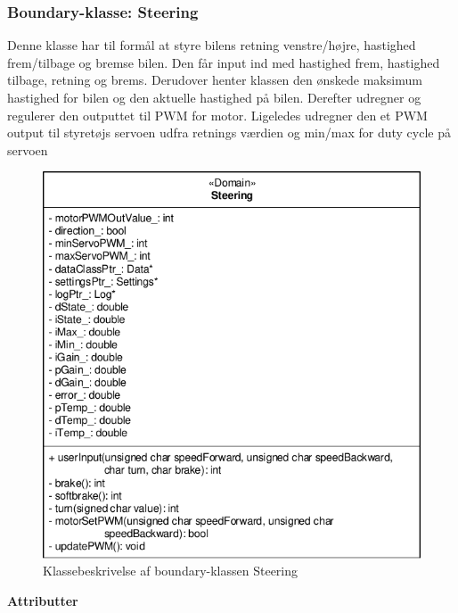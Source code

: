 
\subsubsection{Boundary-klasse: Steering}
Denne klasse har til formål at styre bilens retning venstre/højre, hastighed frem/tilbage og bremse bilen. Den får input ind med hastighed frem, hastighed tilbage, retning og brems. Derudover henter klassen den ønskede maksimum hastighed for bilen og den aktuelle hastighed på bilen. Derefter udregner og regulerer den outputtet til PWM for motor. Ligeledes udregner den et PWM output til styretøjs servoen udfra retnings værdien og min/max for duty cycle på servoen 


\begin{figure}[h]
\centering
\includegraphics[]{../fig/diagrammer/bil/cd_steering.pdf}
\caption{Klassebeskrivelse af boundary-klassen Steering}
\label{fig:cd_Steering}
\end{figure}

\textbf{Attributter}

